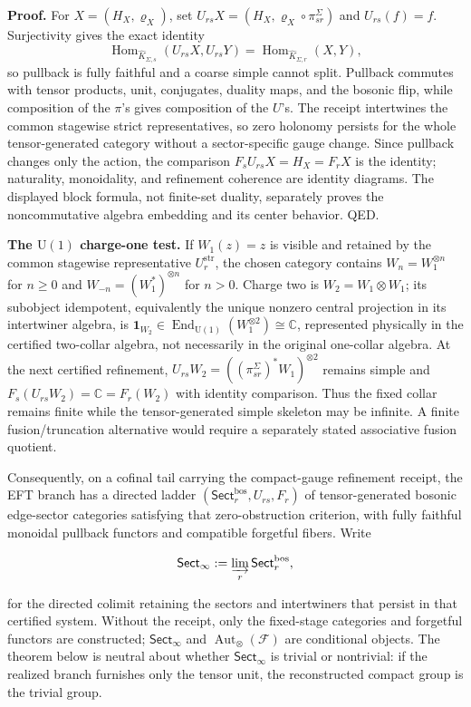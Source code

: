 \textbf{Proof.} For \(X=(H_X,\varrho_X)\), set
\(U_{rs}X=(H_X,\varrho_X\circ\pi_{sr}^{\Sigma})\) and \(U_{rs}(f)=f\). Surjectivity gives the
exact identity
\[
\operatorname{Hom}_{\widehat K_{\Sigma,s}}(U_{rs}X,U_{rs}Y)
=\operatorname{Hom}_{\widehat K_{\Sigma,r}}(X,Y),
\]
so pullback is fully faithful and a coarse simple cannot split. Pullback commutes with tensor
products, unit, conjugates, duality maps, and the bosonic flip, while composition of the \(\pi\)'s
gives composition of the \(U\)'s. The receipt intertwines the common stagewise strict
representatives, so zero holonomy persists for the whole tensor-generated category without a
sector-specific gauge change. Since pullback changes only the action, the comparison
\(F_sU_{rs}X=H_X=F_rX\) is the identity; naturality, monoidality, and refinement coherence are
identity diagrams. The displayed block formula, not finite-set duality, separately proves the
noncommutative algebra embedding and its center behavior. QED.

\textbf{The \(\mathrm U(1)\) charge-one test.} If \(W_1(z)=z\) is visible and retained by the
common stagewise representative \(U^{\mathrm{str}}_r\), the chosen category
contains \(W_n=W_1^{\otimes n}\) for \(n\geq0\) and
\(W_{-n}=(W_1^*)^{\otimes n}\) for \(n>0\). Charge two is \(W_2=W_1\otimes W_1\); its subobject
idempotent, equivalently the unique nonzero central projection in its intertwiner algebra, is
\(\mathbf 1_{W_2}\in\operatorname{End}_{\mathrm U(1)}(W_1^{\otimes2})\cong\mathbb C\),
represented physically in the certified two-collar algebra, not necessarily in the original
one-collar algebra. At the next certified refinement,
\(U_{rs}W_2=((\pi_{sr}^{\Sigma})^*W_1)^{\otimes2}\) remains simple and
\(F_s(U_{rs}W_2)=\mathbb C=F_r(W_2)\) with identity comparison. Thus the fixed collar remains
finite while the tensor-generated simple skeleton may be infinite. A finite fusion/truncation
alternative would require a separately stated associative fusion quotient.

Consequently, on a cofinal tail carrying the compact-gauge refinement receipt, the EFT branch has a directed ladder \((\mathsf{Sect}^{\mathrm{bos}}_r,U_{rs},F_r)\) of tensor-generated bosonic edge-sector categories satisfying that zero-obstruction criterion, with fully faithful monoidal pullback functors and compatible forgetful fibers. Write

\[
\mathsf{Sect}_\infty := \varinjlim_r \mathsf{Sect}^{\mathrm{bos}}_r,
\]

for the directed colimit retaining the sectors and intertwiners that persist in that certified system. Without the receipt, only the fixed-stage categories and forgetful functors are constructed; \(\mathsf{Sect}_\infty\) and \(\operatorname{Aut}_\otimes(\mathcal F)\) are conditional objects. The theorem below is neutral about whether \(\mathsf{Sect}_\infty\) is trivial or nontrivial: if the realized branch furnishes only the tensor unit, the reconstructed compact group is the trivial group.

